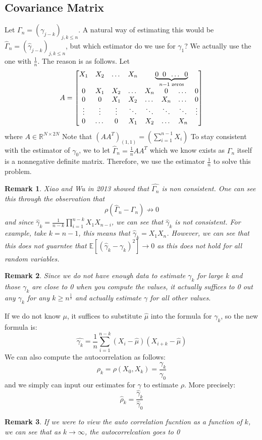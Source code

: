 \documentclass[12pt]{article}
\newtheorem{remark}{Remark}
\newcommand{\R}{\mathbb{R}}
\newcommand{\E}{\mathbb{E}}
\begin{document}
\subsection{Covariance Matrix}
Let $\Gamma_n = (\gamma_{j - k})_{j ,k \leq n}$. A natural way of estimating this would be $\hat{\Gamma}_n = (\hat{\gamma}_{j-k})_{j, k \leq n}$, but which estimator do we use for $\gamma_1$? We actually use the one with $\frac{1}{n}$. The reason is as follows. Let 
\[
A =
\begin{bmatrix}
X_1 & X_2 & \dots & X_n & \multicolumn{4}{c}{\underbrace{0 \;\; 0 \;\; \dots \;\; 0}_{n-1\text{ zeros}}} \\
0   & X_1 & X_2 & \dots & X_n & 0 & \dots & 0 \\
0   & 0   & X_1 & X_2 & \dots & X_n & \dots & 0 \\
\vdots & \vdots & \vdots & \ddots & \ddots & \ddots & \ddots & \vdots \\
0 & \dots & 0 & X_1 & X_2 & \dots & X_n
\end{bmatrix}
\]
where $A \in \R^{N \times 2N}$ Note that $(AA^T)_{(1,1)} = \left(\sum_{i=1}^{n-1}X_i\right)$ To stay consistent with the estimator of $\gamma_0$, we to let $\hat{\Gamma}_n = \frac{1}{n}AA^T$ which we know exists as $\Gamma_n$ itself is a nonnegative definite matrix. Therefore, we use the estimator $\frac{1}{n}$ to solve this problem. 
\begin{remark}
	Xiao and Wu in 2013 showed that $\hat{\Gamma_n}$ is non consistent. One can see this through the observation that 
	\[
		\rho(\hat{\Gamma}_n - \Gamma_n) \not \to 0
	\]
	and since $\hat{\gamma}_k = \frac{1}{n-k}\prod_{i = 1}^{n-k} X_1X_{n-i}$, we can see that $\hat{\gamma}_k$ is not consistent. For example, take $k = n-1$, this means that $\hat{\gamma}_k = X_1X_n$. However, we can see that this does not guarntee that $\E[(\hat{\gamma}_k - \gamma_k)^2] \to 0$ as this does not hold for all random variables. 
\end{remark}
\begin{remark}
	Since we do not have enough data to estimate $\gamma_k$ for large k and those $\gamma_k$ are close to 0 when you compute the values, it actually suffices to 0 out any $\gamma_k$ for any $k \geq n^\frac{1}{3}$ and actually estimate $\gamma$ for all other values. 
\end{remark}
If we do not know $\mu$, it suffices to substitute $\hat{\mu}$ into the formula for $\gamma_k$, so the new formula is:
\[
\hat{\gamma_k} = \frac{1}{n} \sum_{i = 1}^{n-k} (X_i - \hat{\mu})(X_{i+k} - \hat{\mu})
\]
We can also compute the autocorrelation as follows:
\[
	\rho_k = \rho(X_0, X_k) = \frac{\gamma_k}{\gamma_0}
\]
and we simply can input our estimates for $\gamma$ to estimate $\rho$. More precisely:
\[
	\hat{\rho}_k = \frac{\hat{\gamma}_k}{\hat{\gamma}_0}
\]
\begin{remark}
	If we were to view the auto correlation fucntion as a function of $k$, we can see that as $k \to \infty$, the autocorrelcation goes to 0 
\end{remark}
\end{document}
